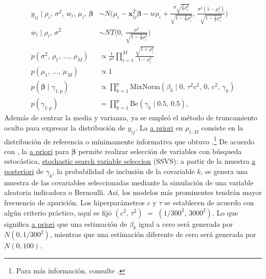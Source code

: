 \documentclass[11pt]{article}
\begin{document}
\begin{equation}
\label{eq:modelo-jerarquico}
\begin{aligned}
y_{ij} \mid \rho_{i},\, \sigma^{2},\, w_{i},\, \mu_{i},\, \boldsymbol{\beta} &\sim N\big(\mu_{i} - \boldsymbol{x}_{ij}^{T}\boldsymbol{\beta} - w\rho_{i} + \frac{\sigma\sqrt{\frac{2}{\pi}\rho_{i}^{2}}}{\sqrt{1-\frac{2}{\pi}\rho_{i}^{2}}},\, \frac{\sigma^{2}(1-\rho_{i}^{2})}{\sqrt{1-\frac{2}{\pi}\rho_{i}^{2}}}\big) \\
w_{i} \mid \rho_{i},\, \sigma^{2} &\sim NT\big(0,\, \frac{\sigma^{2}}{\sqrt{1-\frac{2}{\pi}\rho_{i}^{2}}}\big) \\
p(\sigma^{2},\, \rho_{1},\, \ldots,\, \rho_{M}) &\propto \frac{1}{\sigma^{2}} \prod_{i=1}^{M}\frac{\sqrt{1+\rho_{i}^{2}}}{1-\rho_{i}^{2}} \\
p(\mu_{1},\, \ldots,\, \mu_{M}) &\propto 1 \\
p(\boldsymbol{\beta} \mid \gamma_{1:p}) &\propto\prod_{k=1}^{p}\text{MixNorm}(\beta_{k} \mid 0,\, \tau^{2}c^{2},\, 0,\, c^{2},\, \gamma_{k}) \\
p(\gamma_{1:p}) &= \prod_{k=1}^{p} \text{Be}(\gamma_{k} \mid 0.5,\, 0.5) ,
\end{aligned}
\end{equation}
Además de centrar la media y varianza, ya se empleó el método de truncamiento oculto para expresar la distribución de $y_{ij}$. La \underline{a priori} en $\rho_{1:M}$ consiste en la distribución de referencia o mínimamente informativa que obtuvo \textcite{Araceli}.\footnote{Para más información, consulte \textcite{bernardo:1992}.}
De acuerdo con \parencite{ssvs:1993}, la \underline{a priori} para $\boldsymbol{\beta}$ permite realizar selección de variables con búsqueda estocástica, \underline{stochastic search variable seleccion} (SSVS): a partir de la muestra \underline{a posteriori} de $\gamma_{k}$, la probabilidad de inclusión de la covariable $k$, se genera una muestra de las covariables seleccionadas mediante la simulación de una variable aleatoria indicadora o Bernoulli. Así, los modelos más prominentes tendrán mayor frecuencia de aparición. Los hiperparámetros $c$ y $\tau$ se establecen de acuerdo con algún criterio práctico, aquí se fijó $(c^{2},\, \tau^{2})$ $=$ $(1/300^{2},\, 3000^{2})$. Lo que significa \underline{a priori} que una estimación de $\beta_{k}$ igual a cero será generada por $N(0, 1/300^{2})$, mientras que una estimación diferente de cero será generada por $N(0, 100)$.
\end{document}
